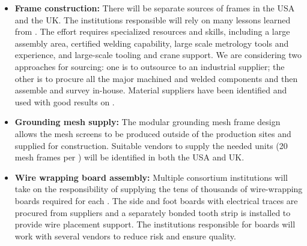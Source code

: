 \begin{itemize}

\item {\bf Frame construction:} There will be separate sources of frames in the USA and the UK. The institutions responsible will rely on many lessons learned from . The effort requires specialized resources and skills, including a large assembly area, certified welding capability, large scale metrology tools and experience, and large-scale tooling and crane support. We are considering two approaches for sourcing: one is to outsource to an industrial supplier; the other is to procure all the major machined and welded components and then assemble and survey in-house. Material suppliers have been identified and used with good results on .

\item {\bf Grounding mesh supply:} The modular grounding mesh frame design allows the mesh screens to be produced outside of the  production sites and supplied for  construction.  Suitable vendors to supply the needed units (20 mesh frames per ) will be identified in both the USA and UK.   %

\item {\bf Wire wrapping board assembly:} Multiple consortium institutions will take on the responsibility of supplying the tens of thousands of wire-wrapping boards required for each  . The side and foot boards with electrical traces are procured from suppliers and a separately bonded tooth strip is installed to provide wire placement support. %
The institutions responsible for boards will work with several vendors to reduce risk and ensure quality. 



\end{itemize}
